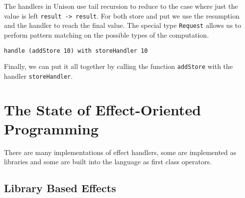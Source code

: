 \documentclass[logo,bsc,singlespacing,parskip]{infthesis}
\begin{document}
The handlers in Unison use tail recursion to reduce to the case where just the
value is left \texttt{result -> result}. For both store and put we use the
resumption and the handler to reach the final value. The special type
\texttt{Request} allows us to perform pattern matching on the possible types of
the computation.

\begin{lstlisting}
handle (addStore 10) with storeHandler 10
\end{lstlisting}

Finally, we can put it all together by calling the function \texttt{addStore}
with the handler \texttt{storeHandler}. 


\section{The State of Effect-Oriented Programming}

There are many implementations of effect handlers, some are implemented as
libraries and some are built into the language as first class operators.

\subsection{Library Based Effects}
\end{document}

